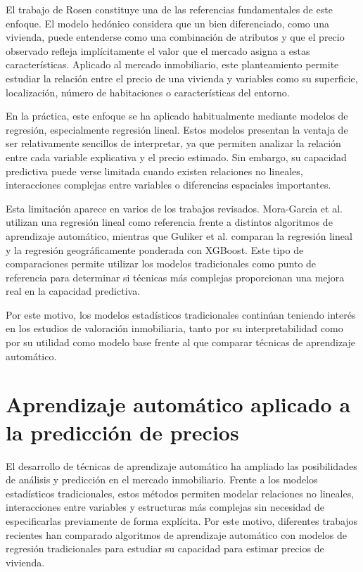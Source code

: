 \documentclass[IB]{TFUOC}%
\begin{document}
El trabajo de Rosen \cite{rosen1974hedonic} constituye una de las referencias fundamentales de este enfoque. El modelo hedónico considera que un bien diferenciado, como una vivienda, puede entenderse como una combinación de atributos y que el precio observado refleja implícitamente el valor que el mercado asigna a estas características. Aplicado al mercado inmobiliario, este planteamiento permite estudiar la relación entre el precio de una vivienda y variables como su superficie, localización, número de habitaciones o características del entorno.

En la práctica, este enfoque se ha aplicado habitualmente mediante modelos de regresión, especialmente regresión lineal. Estos modelos presentan la ventaja de ser relativamente sencillos de interpretar, ya que permiten analizar la relación entre cada variable explicativa y el precio estimado. Sin embargo, su capacidad predictiva puede verse limitada cuando existen relaciones no lineales, interacciones complejas entre variables o diferencias espaciales importantes.

Esta limitación aparece en varios de los trabajos revisados. Mora-Garcia et al. \cite{moragarcia2022housing} utilizan una regresión lineal como referencia frente a distintos algoritmos de aprendizaje automático, mientras que Guliker et al. \cite{guliker2022spatial} comparan la regresión lineal y la regresión geográficamente ponderada con XGBoost. Este tipo de comparaciones permite utilizar los modelos tradicionales como punto de referencia para determinar si técnicas más complejas proporcionan una mejora real en la capacidad predictiva.

Por este motivo, los modelos estadísticos tradicionales continúan teniendo interés en los estudios de valoración inmobiliaria, tanto por su interpretabilidad como por su utilidad como modelo base frente al que comparar técnicas de aprendizaje automático.

\section{Aprendizaje automático aplicado a la predicción de precios}

El desarrollo de técnicas de aprendizaje automático ha ampliado las posibilidades de análisis y predicción en el mercado inmobiliario. Frente a los modelos estadísticos tradicionales, estos métodos permiten modelar relaciones no lineales, interacciones entre variables y estructuras más complejas sin necesidad de especificarlas previamente de forma explícita. Por este motivo, diferentes trabajos recientes han comparado algoritmos de aprendizaje automático con modelos de regresión tradicionales para estudiar su capacidad para estimar precios de vivienda.
\end{document}
